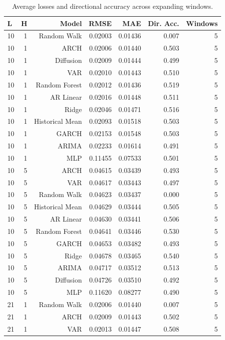 \begin{table}[!htbp]
\centering
\caption{Average losses and directional accuracy across expanding windows.}
\label{tab:model-performance-summary}
\begin{tabular}{lrrrrrr}
\toprule
L & H & Model & RMSE & MAE & Dir. Acc. & Windows \\
\midrule
10 & 1 & Random Walk & 0.02003 & 0.01436 & 0.007 & 5 \\
10 & 1 & ARCH & 0.02006 & 0.01440 & 0.503 & 5 \\
10 & 1 & Diffusion & 0.02009 & 0.01444 & 0.499 & 5 \\
10 & 1 & VAR & 0.02010 & 0.01443 & 0.510 & 5 \\
10 & 1 & Random Forest & 0.02012 & 0.01436 & 0.519 & 5 \\
10 & 1 & AR Linear & 0.02016 & 0.01448 & 0.511 & 5 \\
10 & 1 & Ridge & 0.02046 & 0.01471 & 0.516 & 5 \\
10 & 1 & Historical Mean & 0.02093 & 0.01518 & 0.503 & 5 \\
10 & 1 & GARCH & 0.02153 & 0.01548 & 0.503 & 5 \\
10 & 1 & ARIMA & 0.02233 & 0.01614 & 0.491 & 5 \\
10 & 1 & MLP & 0.11455 & 0.07533 & 0.501 & 5 \\
10 & 5 & ARCH & 0.04615 & 0.03439 & 0.493 & 5 \\
10 & 5 & VAR & 0.04617 & 0.03443 & 0.497 & 5 \\
10 & 5 & Random Walk & 0.04623 & 0.03437 & 0.000 & 5 \\
10 & 5 & Historical Mean & 0.04629 & 0.03444 & 0.505 & 5 \\
10 & 5 & AR Linear & 0.04630 & 0.03441 & 0.506 & 5 \\
10 & 5 & Random Forest & 0.04641 & 0.03446 & 0.530 & 5 \\
10 & 5 & GARCH & 0.04653 & 0.03482 & 0.493 & 5 \\
10 & 5 & Ridge & 0.04678 & 0.03465 & 0.540 & 5 \\
10 & 5 & ARIMA & 0.04717 & 0.03512 & 0.513 & 5 \\
10 & 5 & Diffusion & 0.04726 & 0.03510 & 0.492 & 5 \\
10 & 5 & MLP & 0.11620 & 0.08277 & 0.490 & 5 \\
21 & 1 & Random Walk & 0.02006 & 0.01440 & 0.007 & 5 \\
21 & 1 & ARCH & 0.02009 & 0.01443 & 0.502 & 5 \\
21 & 1 & VAR & 0.02013 & 0.01447 & 0.508 & 5 \\

\end{tabular}
\end{table}
